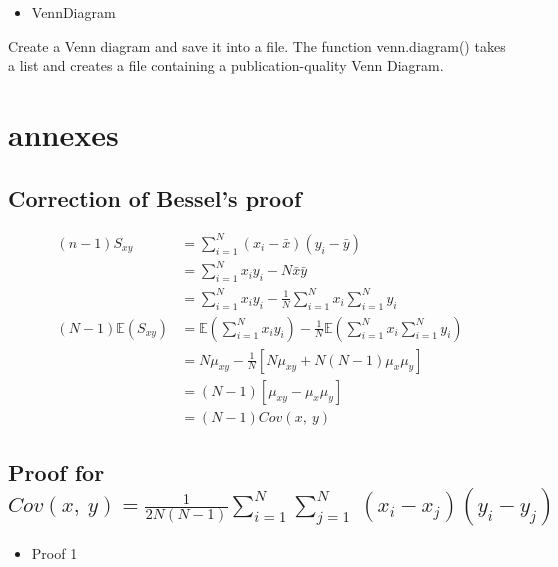 \documentclass[
]{report}
\providecommand{\tightlist}{%
  \setlength{\itemsep}{0pt}\setlength{\parskip}{0pt}}
\begin{document}
\begin{itemize}
\tightlist
\item
  VennDiagram
\end{itemize}

Create a Venn diagram and save it into a file. The function venn.diagram() takes a list and creates a file containing a publication-quality Venn Diagram.

\hypertarget{annexes}{%
\chapter{annexes}\label{annexes}}

\hypertarget{correction-of-bessels-proof}{%
\section{Correction of Bessel's proof}\label{correction-of-bessels-proof}}

\begin{align*}
(n-1)S_{xy} &= \sum_{i=1}^{N}(x_i-\bar x)(y_i - \bar y) \\
&= \sum_{i=1}^{N} x_i y_i -N\bar x \bar y\\
&= \sum_{i=1}^{N} x_i y_i - \frac{1}{N}\sum_{i=1}^{N} x_i \sum_{i=1}^{N} y_i\\
(N-1) \mathbb{E}(S_{xy}) &= \mathbb{E}\left(\sum_{i=1}^{N} x_i y_i\right) 
- \frac{1}{N}\mathbb{E}\left(\sum_{i=1}^{N} x_i \sum_{i=1}^{N} y_i\right)\\
&= N\mu_{xy} - \frac{1}{N}[N\mu_{xy} + N(N-1)\mu_x \mu_y]\\ 
&= (N-1)[\mu_{xy}-\mu_x\mu_y]\\
&= (N-1)Cov(x,~y)
\end{align*}

\hypertarget{proof-for-covxyfrac12nn-1sum_i1n-sum_j1nx_i-x_jy_i-y_j}{%
\section{\texorpdfstring{Proof for \(Cov(x,~y)=\frac{1}{2N(N-1)}\sum_{i=1}^{N} \sum_{j=1}^{N}~(x_i-x_j)(y_i-y_j)\)}{Proof for Cov(x,\textasciitilde y)=\textbackslash frac\{1\}\{2N(N-1)\}\textbackslash sum\_\{i=1\}\^{}\{N\} \textbackslash sum\_\{j=1\}\^{}\{N\}\textasciitilde(x\_i-x\_j)(y\_i-y\_j)}}\label{proof-for-covxyfrac12nn-1sum_i1n-sum_j1nx_i-x_jy_i-y_j}}

\begin{itemize}
\tightlist
\item
  Proof 1
\end{itemize}
\end{document}
